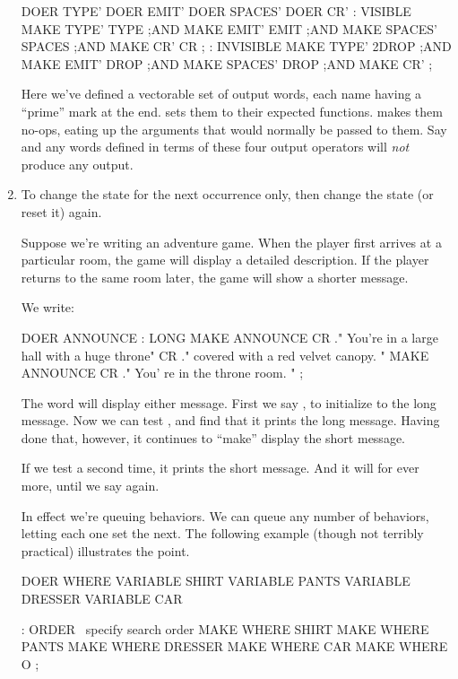 \begin{enumerate}
\begin{Code}
DOER TYPE'
DOER EMIT'
DOER SPACES'
DOER CR'
: VISIBLE     MAKE TYPE'  TYPE ;AND
              MAKE EMIT'  EMIT ;AND
              MAKE SPACES'  SPACES ;AND
              MAKE CR'  CR ;
: INVISIBLE   MAKE TYPE'  2DROP ;AND
              MAKE EMIT'  DROP ;AND
              MAKE SPACES'  DROP ;AND
              MAKE CR'  ;
\end{Code}
Here we've defined a vectorable set of output words, each name having
a ``prime'' mark at the end.  sets them to their
expected functions.   makes them no-ops, eating up
the arguments that would normally be passed to them. Say
 and any words defined in terms of these four output
operators will \emph{not} produce any output.

\item To change the state for the next occurrence only, then change
the state (or reset it) again.

Suppose we're writing an adventure game. When the player first arrives
at a particular room, the game will display a detailed description. If
the player returns to the same room later, the game will show a
shorter message.

\goodbreak
We write:
\begin{Code}
DOER ANNOUNCE
: LONG MAKE ANNOUNCE
   CR ." You're in a large hall with a huge throne"
   CR  ." covered with a red velvet canopy. "
         MAKE ANNOUNCE
   CR ." You' re in the throne room. " ;
\end{Code}
The word  will display either message. First we say
, to initialize  to the long message. Now we
can test , and find that it prints the long message.
Having done that, however, it continues to ``make'' 
display the short message.

If we test  a second time, it prints the short message.
And it will for ever more, until we say  again.

In effect we're queuing behaviors. We can queue any number of behaviors,
letting each one set the next. The following example (though not terribly
practical) illustrates the point.

\begin{Code}
DOER WHERE
VARIABLE SHIRT
VARIABLE PANTS
VARIABLE DRESSER
VARIABLE CAR

: ORDER  \  specify search order
   MAKE WHERE  SHIRT   MAKE WHERE  PANTS
   MAKE WHERE  DRESSER   MAKE WHERE CAR
   MAKE WHERE  O ;


\end{Code}
\end{enumerate}
